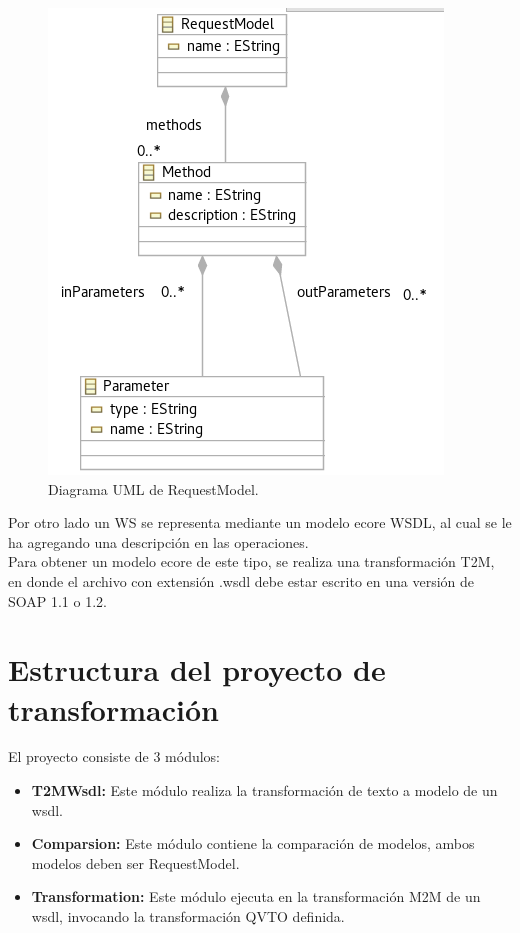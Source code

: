\begin{figure}[!h] 
	\begin{center}
		\includegraphics [scale=0.45]{imagenes/Diagrama_UML_RequestModel.png}
	\end{center}
	\caption{Diagrama UML de RequestModel.}
	\label{fig:Diagrama UML de RequestModel}
\end{figure} 

Por otro lado un WS se representa mediante un modelo ecore WSDL, al cual se le ha agregando una descripción en las operaciones. \\

Para obtener un modelo ecore de este tipo, se realiza una transformación T2M, en donde el archivo con extensión .wsdl debe estar escrito en una versión de SOAP 1.1 o 1.2. 

\section{Estructura del proyecto de transformación}
\label{Estructura del proyecto de transformación}

El proyecto consiste de 3 módulos:
\begin{itemize}
	\item \textbf{T2MWsdl:} Este módulo realiza la transformación de texto a modelo de un wsdl.
	\item \textbf{Comparsion:} Este módulo contiene la comparación de modelos, ambos modelos deben ser RequestModel.
	\item \textbf{Transformation:} Este módulo ejecuta en la transformación M2M de un wsdl, invocando la transformación QVTO definida.
\end{itemize}

